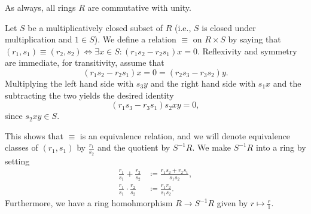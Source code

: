 As always, all rings $R$ are commutative with unity.

Let $S$ be a multiplicatively closed subset of $R$ (i.e.,  $S$ is closed under
multiplication and $1 \in S$). We define a relation $\equiv$ on $R\times S$ by saying
that $(r_1, s_1)\equiv (r_2, s_2)\iff \exists x \in S\colon (r_1s_2 - r_2s_1)x = 0$.
Reflexivity and symmetry are immediate, for transitivity, assume that
\[ (r_1s_2 - r_2s_1)x = 0 = (r_2s_3-r_3s_2)y. \]
Multiplying the left hand side with $s_3y$ and the right hand side with $s_1x$
and the subtracting the two yields the desired identity
\[ (r_1s_3 - r_3s_1)s_2xy = 0, \]
since $s_2xy \in S$.

This shows that $\equiv$ is an equivalence relation, and we will denote equivalence
classes of $(r_1, s_1)$ by $\frac{r_1}{s_2}$ and the quotient by
$S^{-1}R$. We make  $S^{-1}R$ into a ring by setting
\begin{align*}
	\frac{r_1}{s_1}+\frac{r_2}{s_2}&\coloneqq \frac{r_1s_2+r_2s_1}{s_1s_2},\\
	\frac{r_1}{s_1}\cdot\frac{r_2}{s_2}&\coloneqq \frac{r_1r_2}{s_1s_2}.
\end{align*}
Furthermore, we have a ring homohmorphism $R\to S^{-1}R$ given by $r\mapsto\frac{r}{1}$.

